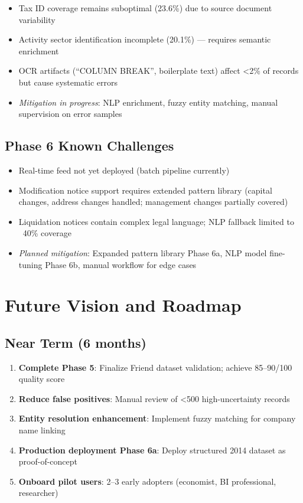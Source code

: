 \documentclass[12pt,a4paper]{report}
\begin{document}
\begin{itemize}
    \item Tax ID coverage remains suboptimal (23.6\%) due to source document variability
    \item Activity sector identification incomplete (20.1\%) — requires semantic enrichment
    \item OCR artifacts (``COLUMN BREAK'', boilerplate text) affect <2\% of records but cause systematic errors
    \item \textit{Mitigation in progress}: NLP enrichment, fuzzy entity matching, manual supervision on error samples
\end{itemize}

\subsection{Phase 6 Known Challenges}

\begin{itemize}
    \item Real-time feed not yet deployed (batch pipeline currently)
    \item Modification notice support requires extended pattern library (capital changes, address changes handled; management changes partially covered)
    \item Liquidation notices contain complex legal language; NLP fallback limited to ~40\% coverage
    \item \textit{Planned mitigation}: Expanded pattern library Phase 6a, NLP model fine-tuning Phase 6b, manual workflow for edge cases
\end{itemize}

\section{Future Vision and Roadmap}

\subsection{Near Term (6 months)}

\begin{enumerate}
    \item \textbf{Complete Phase 5}: Finalize Friend dataset validation; achieve 85--90/100 quality score
    \item \textbf{Reduce false positives}: Manual review of <500 high-uncertainty records
    \item \textbf{Entity resolution enhancement}: Implement fuzzy matching for company name linking
    \item \textbf{Production deployment Phase 6a}: Deploy structured 2014 dataset as proof-of-concept
    \item \textbf{Onboard pilot users}: 2--3 early adopters (economist, BI professional, researcher)
\end{enumerate}
\end{document}
